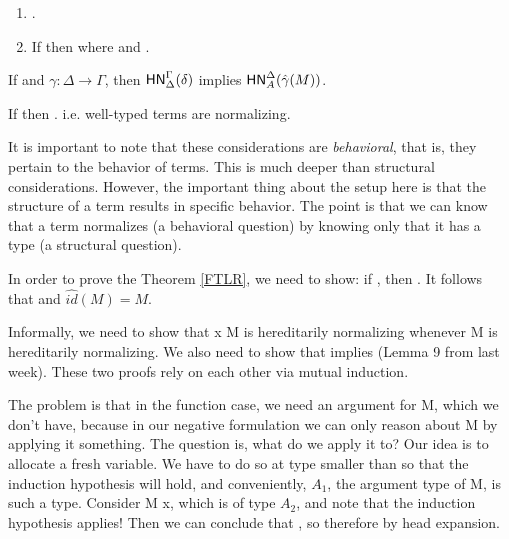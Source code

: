 \documentclass{article}
\begin{document}
\begin{lemma}[Workhorse]\label{lem:workhorse}
\leavevmode %
\begin{enumerate}
\item {}   .
\item If \bnorm{\E} then  where  and .
\end{enumerate}
\end{lemma}


\begin{theorem}
\label{FTLR}
 If  and $\gamma: \Delta \to \Gamma$, then $\mathsf{HN}^{\Gamma}_{\Delta}(\delta)$ implies $\mathsf{HN}^{\Delta}_{A}(\hat{\gamma}(M))$.
 \end{theorem}

 \begin{corollary}
  If  then . i.e. well-typed terms are normalizing.
 \end{corollary}

It is important to note that these considerations are \textit{behavioral}, that is, they pertain to the behavior of terms. This is much deeper than structural considerations. However, the important thing about the setup here is that the structure of a term results in specific behavior. The point is that we can know that a term normalizes (a behavioral question) by knowing only that it has a type (a structural question).

In order to prove the Theorem \ref{FTLR}, we need to show: if , then . It follows that  and $\hat{id}(M) = M$.

Informally, we need to show that x M is hereditarily normalizing whenever M is hereditarily normalizing. We also need to show that  implies  (Lemma 9 from last week). These two proofs rely on each other via mutual induction.

The problem is that in the function case, we need an argument for M, which we don't have, because in our negative formulation we can only reason about M by applying it something. The question is, what do we apply it to? Our idea is to allocate a fresh variable. We have to do so at type smaller than  so that the induction hypothesis will hold, and conveniently, $A_1$, the argument type of M, is such a type. Consider M x, which is of type $A_2$, and note that the induction hypothesis applies! Then we can conclude that , so therefore  by head expansion.
\end{document}
